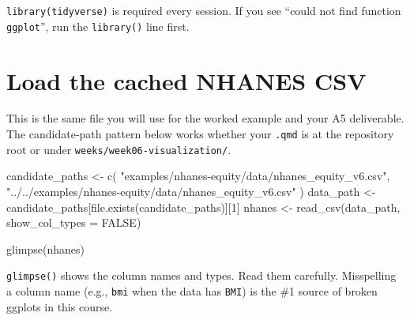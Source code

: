 \documentclass[
  letterpaper,
  DIV=11,
  numbers=noendperiod,
  oneside]{scrreprt}
\newenvironment{Shaded}{\begin{snugshade}}{\end{snugshade}}
\newcommand{\AttributeTok}[1]{\textcolor[rgb]{0.40,0.45,0.13}{#1}}
\newcommand{\ConstantTok}[1]{\textcolor[rgb]{0.56,0.35,0.01}{#1}}
\newcommand{\DecValTok}[1]{\textcolor[rgb]{0.68,0.00,0.00}{#1}}
\newcommand{\FunctionTok}[1]{\textcolor[rgb]{0.28,0.35,0.67}{#1}}
\newcommand{\NormalTok}[1]{\textcolor[rgb]{0.00,0.23,0.31}{#1}}
\newcommand{\OtherTok}[1]{\textcolor[rgb]{0.00,0.23,0.31}{#1}}
\newcommand{\StringTok}[1]{\textcolor[rgb]{0.13,0.47,0.30}{#1}}
\begin{document}
\begin{tcolorbox}[enhanced jigsaw, title=\textcolor{quarto-callout-warning-color}{\faExclamationTriangle}\hspace{0.5em}{Warning}, arc=.35mm, toptitle=1mm, colframe=quarto-callout-warning-color-frame, toprule=.15mm, leftrule=.75mm, bottomtitle=1mm, opacityback=0, bottomrule=.15mm, coltitle=black, breakable, opacitybacktitle=0.6, titlerule=0mm, colback=white, left=2mm, colbacktitle=quarto-callout-warning-color!10!white, rightrule=.15mm]

\texttt{library(tidyverse)} is required every session. If you see
``could not find function \texttt{ggplot}'', run the \texttt{library()}
line first.

\end{tcolorbox}

\section*{Load the cached NHANES CSV}\label{load-the-cached-nhanes-csv}


This is the same file you will use for the worked example and your A5
deliverable. The candidate-path pattern below works whether your
\texttt{.qmd} is at the repository root or under
\texttt{weeks/week06-visualization/}.

\begin{Shaded}
\begin{Highlighting}[numbers=left,,]
\NormalTok{candidate\_paths }\OtherTok{\textless{}{-}} \FunctionTok{c}\NormalTok{(}
  \StringTok{"examples/nhanes{-}equity/data/nhanes\_equity\_v6.csv"}\NormalTok{,}
  \StringTok{"../../examples/nhanes{-}equity/data/nhanes\_equity\_v6.csv"}
\NormalTok{)}
\NormalTok{data\_path }\OtherTok{\textless{}{-}}\NormalTok{ candidate\_paths[}\FunctionTok{file.exists}\NormalTok{(candidate\_paths)][}\DecValTok{1}\NormalTok{]}
\NormalTok{nhanes }\OtherTok{\textless{}{-}} \FunctionTok{read\_csv}\NormalTok{(data\_path, }\AttributeTok{show\_col\_types =} \ConstantTok{FALSE}\NormalTok{)}

\FunctionTok{glimpse}\NormalTok{(nhanes)}
\end{Highlighting}
\end{Shaded}

\texttt{glimpse()} shows the column names and types. Read them
carefully. Misspelling a column name (e.g., \texttt{bmi} when the data
has \texttt{BMI}) is the \#1 source of broken ggplots in this course.
\end{document}
